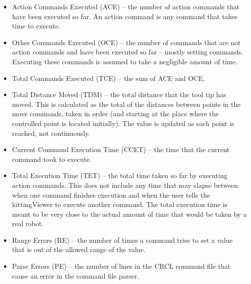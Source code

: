 \begin{itemize}

\item \sf Action Commands Executed (ACE) \rm -- the number of action commands that
  have been executed so far. An action command is any command that takes
  time to execute.\\

\item \sf Other Commands Executed (OCE) \rm -- the number of commands that are
  not action commands and have been executed so far -- mostly setting
  commands. Executing these commands is assumed to take a negligible amount
  of time.\\
   
 \item \sf Total Commands Executed (TCE) \rm -- the sum of ACE and OCE.\\

\item \sf Total Distance Moved (TDM) \rm -- the total distance that the
  tool tip has moved.  This is calculated as the total of the distances between 
  points in
  the move commands, taken in order (and starting at the place where the
  controlled point is located initially). The value is updated as each point
  is reached, not continuously.\\
  
 \item \sf Current Command Execution Time (CCET) \rm -- the time that the current
   command took to execute.\\
   
\item \sf Total Execution Time (TET) \rm -- the total time taken so far by
  executing action commands. This does not include any time that may elapse
  between when one command finishes execution and when the user tells the
  kittingViewer to execute another command. The total execution time is
  meant to be very close to the actual amount of time that would be taken
  by a real robot.\\

\item \sf Range Errors (RE) \rm -- the number of times a command tries to set a
  value that is out of the allowed range of the value.\\

\item \sf Parse Errors  (PE) \rm -- the number of lines in the CRCL command file
  that cause an error in the command file parser. \\


\end{itemize}
